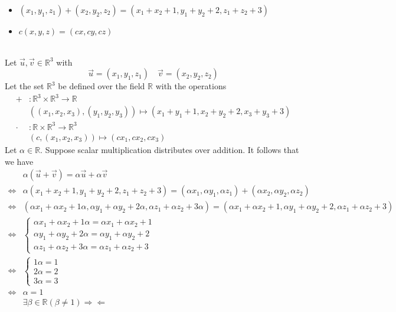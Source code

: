 \documentclass{article}
\begin{document}
\begin{itemize}
\item $(x_1, y_1, z_1)	 + 	(x_2, y_2, z_2)	 = 	(x_1 + x_2 + 1, y_1 + y_2 + 2, z_1 + z_2 + 3)$

\item $c(x, y, z)	 = 	(cx, cy, cz)$
\end{itemize}
\noindent\makebox[\linewidth]{\rule{\linewidth}{0.4pt}}\\
Let \(\vec{u} ,\vec{v} \in\mathbb{R} ^3\) with
\[\vec{u} =(x_1,y_1,z_1)\quad \vec{v} =(x_2,y_2,z_2)\]
Let the set \(\mathbb{R} ^3\) be defined over the field \(\mathbb{R} \) with the operations 
\begin{align*}
  +&:\mathbb{R} ^3 \times \mathbb{R} ^3 \to \mathbb{R} \\
  &\left( \left( x_1,x_2,x_3 \right),(y_1,y_2,y_3)  \right) \mapsto \left( x_1 +y_1 +1,x_2 +y_2 +2,x_3 +y_3 +3 \right)\\
  \cdot&:\mathbb{R} \times \mathbb{R} ^3 \to \mathbb{R} ^3\\
  &\left( c,\left( x_1,x_2,x_3 \right)  \right) \mapsto \left( cx_1,cx_2,cx_3 \right)
\end{align*}
Let \(\alpha \in\mathbb{R} \). Suppose scalar multiplication distributes over addition. It follows that we have
\begin{align*}
  &\alpha (\vec{u} +\vec{v} )=\alpha \vec{u} +\alpha \vec{v}\\
  \Longleftrightarrow  &\alpha (x_1 +x_2 +1,y_1 +y_2 +2,z_1 +z_2 +3 )=(\alpha x_1,\alpha y_1,\alpha z_1)+(\alpha x_2,\alpha y_2,\alpha z_2)\\
  \Longleftrightarrow  &(\alpha x_1 +\alpha x_2 +1\alpha,\alpha y_1 +\alpha y_2 +2\alpha,\alpha z_1 +\alpha z_2 +3\alpha  )=(\alpha x_1 +\alpha x_2 +1,\alpha y_1 +\alpha y_2 +2,\alpha z_1 +\alpha z_2 +3  )\\
  \Longleftrightarrow  &\left\{\begin{array}{c}
    \alpha x_1 +\alpha x_2 +1\alpha=\alpha x_1 +\alpha x_2 +1\\
    \alpha y_1 +\alpha y_2 +2\alpha=\alpha y_1 +\alpha y_2 +2\\
    \alpha z_1 +\alpha z_2 +3\alpha=\alpha z_1 +\alpha z_2 +3
  \end{array}\right.\\
  \Longleftrightarrow  &\left\{\begin{array}{c}
  1\alpha=1\\
  2\alpha=2\\
  3\alpha=3
\end{array}\right.\\
\Longleftrightarrow &\alpha =1\\
&\exists \beta \in\mathbb{R} (\beta \neq 1)\Longrightarrow \Longleftarrow
\end{align*}
\end{document}
